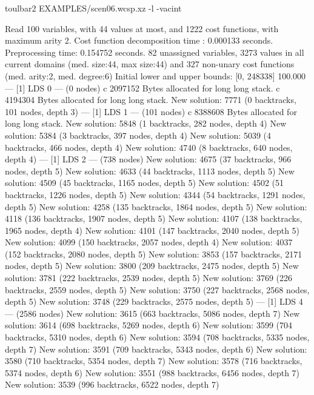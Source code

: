 \begin{enumerate}
\begin{DoxyCode}
	toulbar2 EXAMPLES/scen06.wcsp.xz -l -vacint
\end{DoxyCode}
{\scriptsize
\begin{DoxyCode}
Read 100 variables, with 44 values at most, and 1222 cost functions, with maximum arity 2.
Cost function decomposition time : 0.000133 seconds.
Preprocessing time: 0.154752 seconds.
82 unassigned variables, 3273 values in all current domains (med. size:44, max size:44) and 327 non-unary cost functions (med. arity:2, med. degree:6)
Initial lower and upper bounds: [0, 248338] 100.000%
--- [1] LDS 0 --- (0 nodes)
c 2097152 Bytes allocated for long long stack.
c 4194304 Bytes allocated for long long stack.
New solution: 7771 (0 backtracks, 101 nodes, depth 3)
--- [1] LDS 1 --- (101 nodes)
c 8388608 Bytes allocated for long long stack.
New solution: 5848 (1 backtracks, 282 nodes, depth 4)
New solution: 5384 (3 backtracks, 397 nodes, depth 4)
New solution: 5039 (4 backtracks, 466 nodes, depth 4)
New solution: 4740 (8 backtracks, 640 nodes, depth 4)
--- [1] LDS 2 --- (738 nodes)
New solution: 4675 (37 backtracks, 966 nodes, depth 5)
New solution: 4633 (44 backtracks, 1113 nodes, depth 5)
New solution: 4509 (45 backtracks, 1165 nodes, depth 5)
New solution: 4502 (51 backtracks, 1226 nodes, depth 5)
New solution: 4344 (54 backtracks, 1291 nodes, depth 5)
New solution: 4258 (135 backtracks, 1864 nodes, depth 5)
New solution: 4118 (136 backtracks, 1907 nodes, depth 5)
New solution: 4107 (138 backtracks, 1965 nodes, depth 4)
New solution: 4101 (147 backtracks, 2040 nodes, depth 5)
New solution: 4099 (150 backtracks, 2057 nodes, depth 4)
New solution: 4037 (152 backtracks, 2080 nodes, depth 5)
New solution: 3853 (157 backtracks, 2171 nodes, depth 5)
New solution: 3800 (209 backtracks, 2475 nodes, depth 5)
New solution: 3781 (222 backtracks, 2539 nodes, depth 5)
New solution: 3769 (226 backtracks, 2559 nodes, depth 5)
New solution: 3750 (227 backtracks, 2568 nodes, depth 5)
New solution: 3748 (229 backtracks, 2575 nodes, depth 5)
--- [1] LDS 4 --- (2586 nodes)
New solution: 3615 (663 backtracks, 5086 nodes, depth 7)
New solution: 3614 (698 backtracks, 5269 nodes, depth 6)
New solution: 3599 (704 backtracks, 5310 nodes, depth 6)
New solution: 3594 (708 backtracks, 5335 nodes, depth 7)
New solution: 3591 (709 backtracks, 5343 nodes, depth 6)
New solution: 3580 (710 backtracks, 5354 nodes, depth 7)
New solution: 3578 (716 backtracks, 5374 nodes, depth 6)
New solution: 3551 (988 backtracks, 6456 nodes, depth 7)
New solution: 3539 (996 backtracks, 6522 nodes, depth 7)

\end{DoxyCode}}
\end{enumerate}
